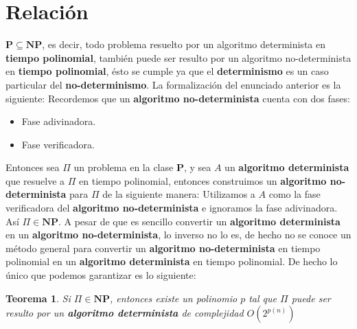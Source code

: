 \documentclass{article}
\newtheorem{theorem}{Teorema}[section]
\begin{document}

\section{Relación}
\noindent
\(\mathbf{P} \subseteq \mathbf{NP}\), es decir, todo problema resuelto por un algoritmo determinista en \textbf{tiempo polinomial}, también 
puede ser resulto por un algoritmo no-determinista en \textbf{tiempo polinomial}, ésto se cumple ya que el \textbf{determinismo}
es un caso particular del \textbf{no-determinismo}. La formalización del enunciado anterior es la siguiente:
\newline 
Recordemos que un \textbf{algoritmo no-determinista} cuenta con dos fases:
\begin{itemize}
    \item Fase adivinadora.
    \item Fase verificadora.
\end{itemize}
Entonces sea \(\Pi\) un problema en la clase \(\mathbf{P}\), y sea \(A\) un \textbf{algoritmo determinista} que resuelve a \(\Pi\) en tiempo 
polinomial, entonces construimos un \textbf{algoritmo no-determinista} para \(\Pi\) de la siguiente manera:
\newline 
Utilizamos a \(A\) como la fase verificadora del \textbf{algoritmo no-determinista} e ignoramos la fase adivinadora. Así \(\Pi \in \mathbf{NP}\).
\newline 
A pesar de que es sencillo convertir un \textbf{algoritmo determinista} en un \textbf{algoritmo no-determinista}, lo inverso no lo es,
de hecho no se conoce un método general para convertir un \textbf{algoritmo no-determinista} en tiempo polinomial en un 
\textbf{algoritmo determinista} en tiempo polinomial. De hecho lo único que podemos garantizar es lo siguiente:
\begin{theorem}
    Si \(\Pi \in \mathbf{NP}\), entonces existe un polinomio \(p\) tal que \(\Pi\) puede ser resulto por un \textbf{algoritmo determinista}
    de complejidad \(O\left(2^{p(n)}\right)\)
\end{theorem}
\end{document}
